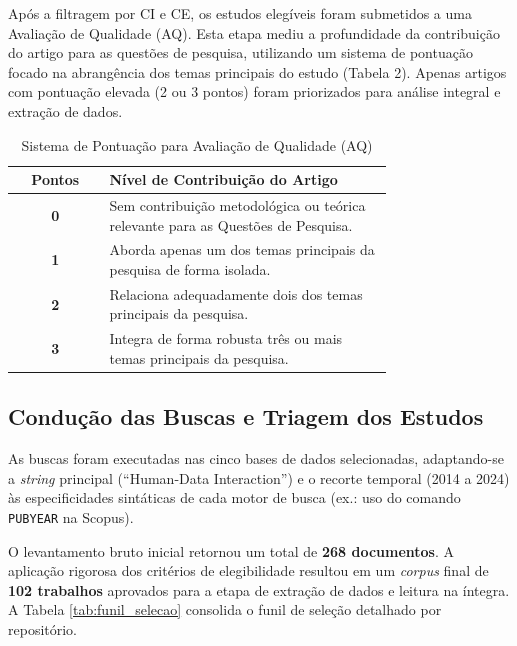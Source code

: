 \documentclass[12pt]{article}
\begin{document}
Após a filtragem por CI e CE, os estudos elegíveis foram submetidos a uma Avaliação de Qualidade (AQ). Esta etapa mediu a profundidade da contribuição do artigo para as questões de pesquisa, utilizando um sistema de pontuação focado na abrangência dos temas principais do estudo (Tabela 2). Apenas artigos com pontuação elevada (2 ou 3 pontos) foram priorizados para análise integral e extração de dados.

\begin{table}[htpb]
\centering
\caption{Sistema de Pontuação para Avaliação de Qualidade (AQ)}
\label{tab:qualidade}
\small
\begin{tabular}{c p{0.75\linewidth}}
\hline
\textbf{Pontos} & \textbf{Nível de Contribuição do Artigo} \\ 
\hline
\textbf{0} & Sem contribuição metodológica ou teórica relevante para as Questões de Pesquisa. \\ 
\hline
\textbf{1} & Aborda apenas um dos temas principais da pesquisa de forma isolada. \\ 
\hline
\textbf{2} & Relaciona adequadamente dois dos temas principais da pesquisa. \\ 
\hline
\textbf{3} & Integra de forma robusta três ou mais temas principais da pesquisa. \\ 
\hline
\end{tabular}
\end{table}

\subsection{Condução das Buscas e Triagem dos Estudos}

As buscas foram executadas nas cinco bases de dados selecionadas, adaptando-se a \textit{string} principal (``Human-Data Interaction'') e o recorte temporal (2014 a 2024) às especificidades sintáticas de cada motor de busca (ex.: uso do comando \texttt{PUBYEAR} na Scopus).

O levantamento bruto inicial retornou um total de \textbf{268 documentos}. A aplicação rigorosa dos critérios de elegibilidade resultou em um \textit{corpus} final de \textbf{102 trabalhos} aprovados para a etapa de extração de dados e leitura na íntegra. A Tabela \ref{tab:funil_selecao} consolida o funil de seleção detalhado por repositório.
\end{document}
